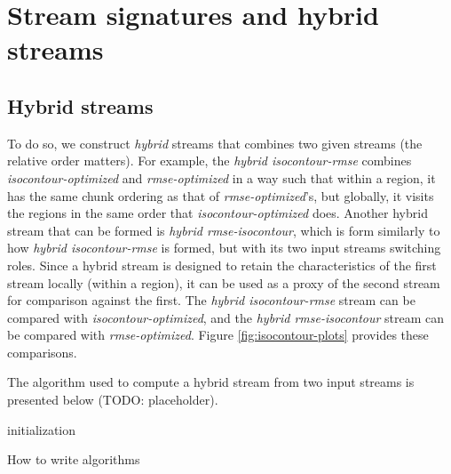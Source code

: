 \section{Stream signatures and hybrid streams}

\subsection{Hybrid streams}

To do so, we construct \emph{hybrid} streams that combines two given streams (the relative order
matters). For example, the \emph{hybrid isocontour-rmse} combines \emph{isocontour-optimized} and
\emph{rmse-optimized} in a way such that within a region, it has the same chunk ordering as that of
\emph{rmse-optimized}'s, but globally, it visits the regions in the same order that
\emph{isocontour-optimized} does. Another hybrid stream that can be formed is \emph{hybrid
rmse-isocontour}, which is form similarly to how \emph{hybrid isocontour-rmse} is formed, but with
its two input streams switching roles. Since a hybrid stream is designed to retain the
characteristics of the first stream locally (within a region), it can be used as a proxy of the
second stream for comparison against the first. The \emph{hybrid isocontour-rmse} stream can be
compared with \emph{isocontour-optimized}, and the \emph{hybrid rmse-isocontour} stream can be
compared with \emph{rmse-optimized}. Figure \ref{fig:isocontour-plots} provides these comparisons.

The algorithm used to compute a hybrid stream from two input streams is presented below (TODO: placeholder).
\begin{algorithm}
  initialization\;
  \caption{How to write algorithms}
\end{algorithm}
